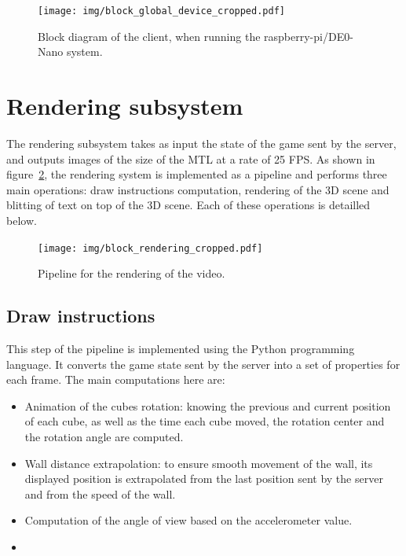 \documentclass[english, DIV=13]{scrartcl}
\begin{document}
\begin{figure}
    \centering
    \texttt{[image: img/block\_global\_device\_cropped.pdf]}
    \caption{Block diagram of the client, when running the raspberry-pi/DE0-Nano system.}
    \label{fig:global-device}
\end{figure}

\section{Rendering subsystem}
\label{sec:rendering}

The rendering subsystem takes as input the state of the game sent by the server,
and outputs images of the size of the MTL at a rate
of 25 FPS. As shown in figure~\ref{fig:rendering}, the rendering system is
implemented as a pipeline and performs three main operations: draw instructions
computation, rendering of the 3D scene and blitting of text on top of the 3D scene.
Each of these operations is detailled below.

\begin{figure}
    \centering
    \texttt{[image: img/block\_rendering\_cropped.pdf]}
    \caption{Pipeline for the rendering of the video.}
    \label{fig:rendering}
\end{figure}

\subsection{Draw instructions}

This step of the pipeline is implemented using the Python programming language.
It converts the game state sent by the server into a set of properties for each
frame. The main computations here are:
\begin{itemize}
    \item Animation of the cubes rotation: knowing the previous and current
        position of each cube, as well as the time each cube moved, the rotation
        center and the rotation angle are computed.
    \item Wall distance extrapolation: to ensure smooth movement of the wall, its
        displayed position is extrapolated from the last position sent by the server
        and from the speed of the wall.
    \item Computation of the angle of view based on the accelerometer value.
    \item {}
\end{itemize}
\end{document}
